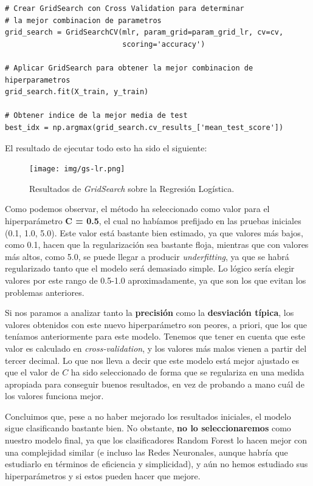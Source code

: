 \documentclass[11pt,a4paper]{article}
\begin{document}
\begin{lstlisting}
# Crear GridSearch con Cross Validation para determinar
# la mejor combinacion de parametros
grid_search = GridSearchCV(mlr, param_grid=param_grid_lr, cv=cv,
                           scoring='accuracy')

# Aplicar GridSearch para obtener la mejor combinacion de hiperparametros
grid_search.fit(X_train, y_train)

# Obtener indice de la mejor media de test
best_idx = np.argmax(grid_search.cv_results_['mean_test_score'])

\end{lstlisting}

El resultado de ejecutar todo esto ha sido el siguiente:

\begin{figure}[H]
    \centering
    \texttt{[image: img/gs-lr.png]}
    \caption{Resultados de \textit{GridSearch} sobre la Regresión Logística.}
    \label{fig:gs-lr}
\end{figure}

Como podemos observar, el método ha seleccionado como valor para el hiperparámetro \textbf{C = 0.5}, el cual no habíamos prefijado en las pruebas
iniciales (0.1, 1.0, 5.0). Este valor está bastante bien estimado, ya que valores más bajos, como 0.1, hacen que la regularización sea bastante
floja, mientras que con valores más altos, como 5.0, se puede llegar a producir \textit{underfitting}, ya que se habrá regularizado tanto que el
modelo será demasiado simple. Lo lógico sería elegir valores por este rango de 0.5-1.0 aproximadamente, ya que son los que evitan los problemas
anteriores.

Si nos paramos a analizar tanto la \textbf{precisión} como la \textbf{desviación típica}, los valores obtenidos con este nuevo hiperparámetro son peores, a
priori, que los que teníamos anteriormente para este modelo. Tenemos que tener en cuenta que este valor es calculado en \textit{cross-validation}, y los
valores más malos vienen a partir del tercer decimal. Lo que nos lleva a decir que este modelo está mejor ajustado es que el valor de $C$ ha sido
seleccionado de forma que se regulariza en una medida apropiada para conseguir buenos resultados, en vez de probando a mano cuál de los valores
funciona mejor.

Concluimos que, pese a no haber mejorado los resultados iniciales, el modelo sigue clasificando bastante bien. No obstante, \textbf{no lo
seleccionaremos} como nuestro modelo final, ya que los clasificadores Random Forest lo hacen mejor con una complejidad similar (e incluso las
Redes Neuronales, aunque habría que estudiarlo en términos de eficiencia y simplicidad), y aún no hemos estudiado sus hiperparámetros y si
estos pueden hacer que mejore.
\end{document}
